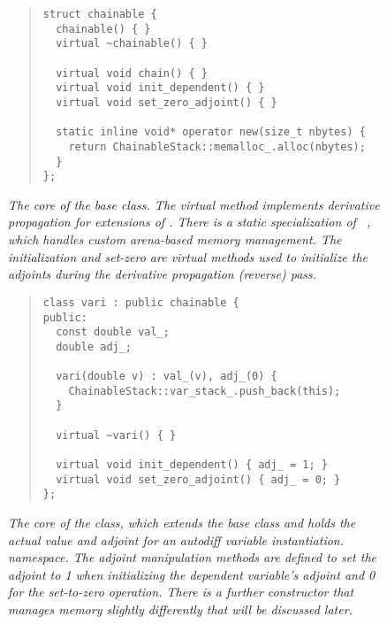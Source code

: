 \documentclass[10pt]{article}
\begin{document}
\begin{figure}
\begin{quote}\small
\begin{Verbatim}
struct chainable {
  chainable() { }
  virtual ~chainable() { }

  virtual void chain() { }
  virtual void init_dependent() { }
  virtual void set_zero_adjoint() { }

  static inline void* operator new(size_t nbytes) {
    return ChainableStack::memalloc_.alloc(nbytes);
  }
};
\end{Verbatim}
\end{quote}
\vspace*{-12pt}
\caption{\small\it The core of the  base class.
  The virtual method  implements derivative propagation
  for extensions of .  There is a static
  specialization of ~, which handles custom
  arena-based memory management.  The initialization and set-zero
  are virtual methods used to initialize the adjoints during the
  derivative propagation (reverse) pass.}\label{chainable-definition.figure}
\end{figure}


\begin{figure}
\begin{quote}\small
\begin{Verbatim}
class vari : public chainable {
public:
  const double val_;
  double adj_;

  vari(double v) : val_(v), adj_(0) { 
    ChainableStack::var_stack_.push_back(this);
  }

  virtual ~vari() { }

  virtual void init_dependent() { adj_ = 1; }
  virtual void set_zero_adjoint() { adj_ = 0; }
};
\end{Verbatim}
\end{quote}
\vspace*{-12pt}
\caption{\small\it The core of the  class, which
  extends the base class  and holds the actual
  value and adjoint for an autodiff variable instantiation.
  namespace.  The adjoint manipulation methods are defined to set the
  adjoint to 1 when initializing the dependent variable's adjoint and
  0 for the set-to-zero operation. There is a further constructor that
  manages memory slightly differently that will be discussed
  later.}\label{vari-definition.figure}
\end{figure}
\end{document}

